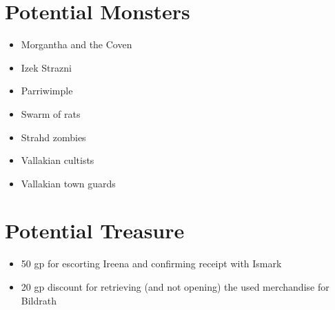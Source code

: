 \documentclass[a4paper,11pt]{article}
\begin{document}
\section{Potential Monsters}
\label{sec:PotentialMonsters}
\begin{itemize}
  \item Morgantha and the Coven
  \item Izek Strazni
  \item Parriwimple
  \item Swarm of rats
  \item Strahd zombies
  \item Vallakian cultists
  \item Vallakian town guards
\end{itemize}


\section{Potential Treasure}
\label{sec:PotentialTreasure}
\begin{itemize}
  \item 50 gp for escorting Ireena and confirming receipt with Ismark
  \item 20 gp discount for retrieving (and not opening) the used merchandise for Bildrath
\end{itemize}
\end{document}
